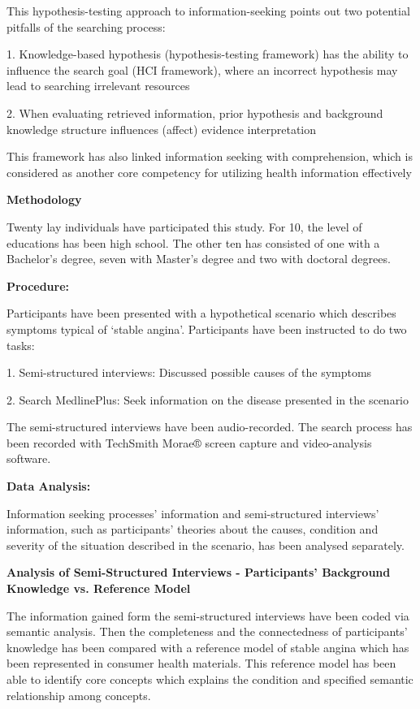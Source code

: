 \documentclass[]{article}
\begin{document}
 
This hypothesis-testing approach to information-seeking points out two potential pitfalls of the searching process:

1.	Knowledge-based hypothesis (hypothesis-testing framework) has the ability to influence the search goal (HCI framework), where an incorrect hypothesis may lead to searching irrelevant resources

2.	When evaluating retrieved information, prior hypothesis and background knowledge structure influences (affect) evidence interpretation

This framework has also linked information seeking with comprehension, which is considered as another core competency for utilizing health information effectively

\textbf{Methodology}

Twenty lay individuals have participated this study. For 10, the level of educations has been high school. The other ten has consisted of one with a Bachelor’s degree, seven with Master’s degree and two with doctoral degrees. 

\textbf{Procedure:}

Participants have been presented with a hypothetical scenario which describes symptoms typical of ‘stable angina’. Participants have been instructed to do two tasks:
  
1.	Semi-structured interviews: Discussed possible causes of the symptoms

2.	Search MedlinePlus: Seek information on the disease presented in the scenario

The semi-structured interviews have been audio-recorded. The search process has been recorded with TechSmith Morae® screen capture and video-analysis software. 

\textbf{Data Analysis:}

Information seeking processes’ information and semi-structured interviews’ information, such as participants’ theories about the causes, condition and severity of the situation described in the scenario, has been analysed separately. 

\textbf{Analysis of Semi-Structured Interviews - Participants’ Background Knowledge vs. Reference Model}

The information gained form the semi-structured interviews have been coded via semantic analysis. Then the completeness and the connectedness of participants’ knowledge has been compared with a reference model of stable angina which has been represented in consumer health materials. This reference model has been able to identify core concepts which explains the condition and specified semantic relationship among concepts.
\end{document}

